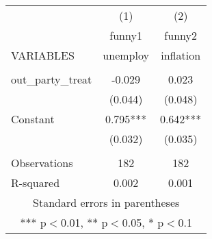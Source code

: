 \documentclass[]{article}
\begin{document}
\begin{tabular}{lcc} \hline
 & (1) & (2) \\
 & funny1 & funny2 \\
VARIABLES & unemploy & inflation \\ \hline
 &  &  \\
out\_party\_treat & -0.029 & 0.023 \\
 & (0.044) & (0.048) \\
Constant & 0.795*** & 0.642*** \\
 & (0.032) & (0.035) \\
 &  &  \\
Observations & 182 & 182 \\
 R-squared & 0.002 & 0.001 \\ \hline
\multicolumn{3}{c}{ Standard errors in parentheses} \\
\multicolumn{3}{c}{ *** p$<$0.01, ** p$<$0.05, * p$<$0.1} \\
\end{tabular}
\end{document}
